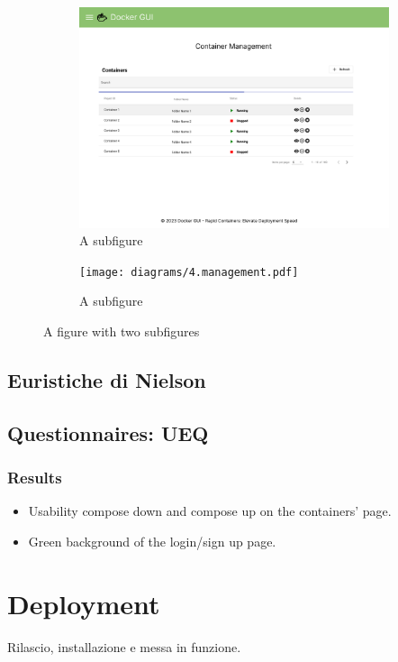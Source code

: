 \documentclass[multi, tikz]{article}
\begin{document}
\begin{figure}
  \centering
  \begin{subfigure}{.5\textwidth}
    \centering
    \includegraphics[width=0.95\linewidth]{diagrams/3.container.pdf}
    \caption{A subfigure}
    \label{fig:sub1}
  \end{subfigure}%
  \begin{subfigure}{.5\textwidth}
    \centering
    \texttt{[image: diagrams/4.management.pdf]}
    \caption{A subfigure}
    \label{fig:sub2}
  \end{subfigure}
  \caption{A figure with two subfigures}
  \label{fig:test}
\end{figure}


\subsection{Euristiche di Nielson}
\subsection{Questionnaires: UEQ}

\subsubsection{Results}
\begin{itemize}
  \item Usability compose down and compose up on the containers' page.
  \item Green background of the login/sign up page.
\end{itemize}

\section{Deployment}
Rilascio, installazione e messa in funzione.
\end{document}
